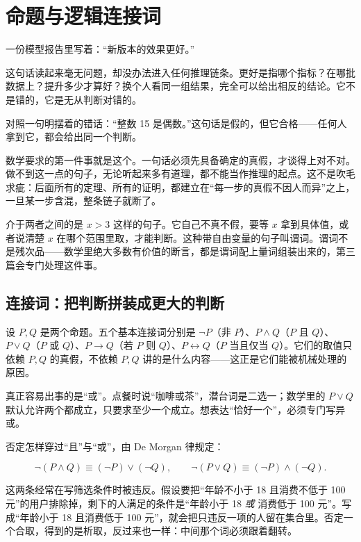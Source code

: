 \section{命题与逻辑连接词}
\label{sec:01-Mathematical-Language/01-Logic/01}

一份模型报告里写着：``新版本的效果更好。''

这句话读起来毫无问题，却没办法进入任何推理链条。更好是指哪个指标？在哪批数据上？提升多少才算好？换个人看同一组结果，完全可以给出相反的结论。它不是错的，它是无从判断对错的。

对照一句明摆着的错话：``整数 15 是偶数。''这句话是假的，但它合格——任何人拿到它，都会给出同一个判断。

数学要求的第一件事就是这个。一句话必须先具备确定的真假，才谈得上对不对。做不到这一点的句子，无论听起来多有道理，都不能当作推理的起点。这不是吹毛求疵：后面所有的定理、所有的证明，都建立在``每一步的真假不因人而异''之上，一旦某一步含混，整条链子就断了。

介于两者之间的是 \(x>3\) 这样的句子。它自己不真不假，要等 \(x\) 拿到具体值，或者说清楚 \(x\) 在哪个范围里取，才能判断。这种带自由变量的句子叫谓词。谓词不是残次品——数学里绝大多数有价值的断言，都是谓词配上量词组装出来的，第三篇会专门处理这件事。

\subsection{连接词：把判断拼装成更大的判断}

设 \(P,Q\) 是两个命题。五个基本连接词分别是 \(\neg P\)（非 \(P\)）、\(P\land Q\)（\(P\) 且 \(Q\)）、\(P\lor Q\)（\(P\) 或 \(Q\)）、\(P\to Q\)（若 \(P\) 则 \(Q\)）、\(P\leftrightarrow Q\)（\(P\) 当且仅当 \(Q\)）。它们的取值只依赖 \(P,Q\) 的真假，不依赖 \(P,Q\) 讲的是什么内容——这正是它们能被机械处理的原因。

真正容易出事的是``或''。点餐时说``咖啡或茶''，潜台词是二选一；数学里的 \(P\lor Q\) 默认允许两个都成立，只要求至少一个成立。想表达``恰好一个''，必须专门写异或。

否定怎样穿过``且''与``或''，由 De Morgan 律规定：

\[
\neg(P\land Q)\equiv(\neg P)\lor(\neg Q),
\qquad
\neg(P\lor Q)\equiv(\neg P)\land(\neg Q).
\]

这两条经常在写筛选条件时被违反。假设要把``年龄不小于 18 且消费不低于 100 元''的用户排除掉，剩下的人满足的条件是``年龄小于 18 \emph{或} 消费低于 100 元''。写成``年龄小于 18 且消费低于 100 元''，就会把只违反一项的人留在集合里。否定一个合取，得到的是析取，反过来也一样：中间那个词必须跟着翻转。

